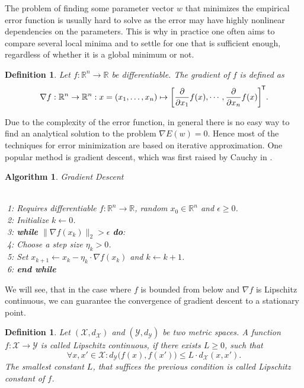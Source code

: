 \documentclass[11pt, a4paper]{article}
\newtheorem{definition}[theorem]{Definition}
\newtheorem{algorithm}[theorem]{Algorithm}
\newcommand{\R}{\mathbb{R}}
\newcommand{\X}{\mathcal{X}}
\newcommand{\Y}{\mathcal{Y}}
\newcommand*{\tr}{^{\mkern-1.5mu\mathsf{T}}}
\begin{document}
The problem of finding some parameter vector $w$ that minimizes the empirical error function is usually hard to solve as the error may have highly nonlinear dependencies on the parameters. This is why in practice one often aims to compare several local minima and to settle for one that is sufficient enough, regardless of whether it is a global minimum or not.

\begin{definition}
Let $f: \R^n \to \R$ be differentiable. The gradient of $f$ is defined as
\[ \nabla f : \R^n \to \R^n : x = (x_1, \dots, x_n) \mapsto \bigg [ \frac{\partial}{\partial x_1} f(x), \cdots, \frac{\partial}{\partial x_n} f(x) \bigg ]\tr . \]
\end{definition}

Due to the complexity of the error function, in general there is no easy way to find an analytical solution to the problem $\nabla E(w) = 0$. Hence most of the techniques for error minimization are based on iterative approximation. One popular method is gradient descent, which was first raised by Cauchy in \cite{GD}.

\begin{algorithm}
\caption{Gradient Descent} \ \\
\textcolor{white}{$\Big |$}1: Requires differentiable $f: \R^n \to \R$, random $x_0 \in \R^n$ and $\epsilon \geq 0$. \\
\textcolor{white}{$\Big |$}2: Initialize $k \leftarrow 0$. \\
\textcolor{white}{$\Big |$}3: \textbf{while} $ \big \| \nabla f(x_k) \big \|_2 > \epsilon $ \textbf{do}:\\
\textcolor{white}{$\Big |$}4: \quad Choose a step size $\eta_k > 0$. \\
\textcolor{white}{$\Big |$}5: \quad Set $x_{k+1} \leftarrow x_k - \eta_k \cdot \nabla f(x_k)$ and $k \leftarrow k+1$. \\
\textcolor{white}{$\Big |$}6: \textbf{end while}
\end {algorithm}

We will see, that in the case where $f$ is bounded from below and $\nabla f$ is Lipschitz continuous, we can guarantee the  convergence of gradient descent to a stationary point.

\begin{definition}
Let $(\X,d_{\X})$ and $(\Y, d_{\Y})$ be two metric spaces. A function $f: \X \to \Y$ is called Lipschitz continuous, if there exists $L \geq 0$, such that
\[ \forall x,x' \in \X : d_{\Y} \big ( f(x) , f(x') \big ) \leq L \cdot d_{\X}(x,x'). \]
The smallest constant $L$, that suffices the previous condition is called Lipschitz constant of $f$.
\end{definition}
\end{document}
